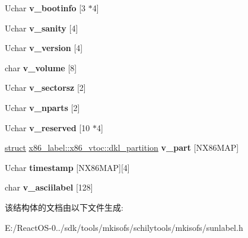 \begin{DoxyCompactItemize}
\item 
\mbox{\label{structx86__label_1_1x86__vtoc_a60356d5132258e17a287f79df84fea9f}} 
Uchar {\bfseries v\+\_\+bootinfo} \mbox{[}3 $\ast$4\mbox{]}
\item 
\mbox{\label{structx86__label_1_1x86__vtoc_a1fecf250f0c82667e29272e8fde36717}} 
Uchar {\bfseries v\+\_\+sanity} \mbox{[}4\mbox{]}
\item 
\mbox{\label{structx86__label_1_1x86__vtoc_a1b735baa03fa6006c30ac8064804f360}} 
Uchar {\bfseries v\+\_\+version} \mbox{[}4\mbox{]}
\item 
\mbox{\label{structx86__label_1_1x86__vtoc_aa168fa734a76cc3d703cc6f270b26519}} 
char {\bfseries v\+\_\+volume} \mbox{[}8\mbox{]}
\item 
\mbox{\label{structx86__label_1_1x86__vtoc_ab7dfcf045f7bcf4c9ae4c5f4947c0c43}} 
Uchar {\bfseries v\+\_\+sectorsz} \mbox{[}2\mbox{]}
\item 
\mbox{\label{structx86__label_1_1x86__vtoc_a0ed65e956a01c2ff443ec8829583cac7}} 
Uchar {\bfseries v\+\_\+nparts} \mbox{[}2\mbox{]}
\item 
\mbox{\label{structx86__label_1_1x86__vtoc_a398bf4ba70076177bd31cf0abd2c4373}} 
Uchar {\bfseries v\+\_\+reserved} \mbox{[}10 $\ast$4\mbox{]}
\item 
\mbox{\label{structx86__label_1_1x86__vtoc_a2d619a19f74d64fcc72c750ad286d236}} 
\hyperlink{interfacestruct}{struct} \hyperlink{structx86__label_1_1x86__vtoc_1_1dkl__partition}{x86\+\_\+label\+::x86\+\_\+vtoc\+::dkl\+\_\+partition} {\bfseries v\+\_\+part} \mbox{[}N\+X86\+M\+AP\mbox{]}
\item 
\mbox{\label{structx86__label_1_1x86__vtoc_a6b05af97f76c9634f651b5747d62b871}} 
Uchar {\bfseries timestamp} \mbox{[}N\+X86\+M\+AP\mbox{]}\mbox{[}4\mbox{]}
\item 
\mbox{\label{structx86__label_1_1x86__vtoc_abb29e8af3fc08698a809b854b3a79dd5}} 
char {\bfseries v\+\_\+asciilabel} \mbox{[}128\mbox{]}
\end{DoxyCompactItemize}


该结构体的文档由以下文件生成\+:\begin{DoxyCompactItemize}
\item 
E\+:/\+React\+O\+S-\/0../sdk/tools/mkisofs/schilytools/mkisofs/sunlabel.\+h\end{DoxyCompactItemize}
